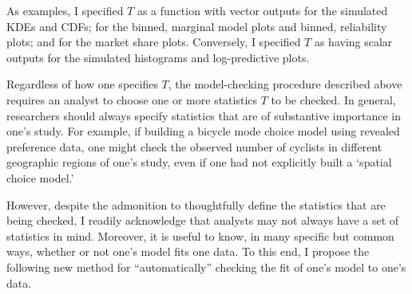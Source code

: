 \documentclass[preprint]{elsarticle}
\begin{document}
As examples, I specified $T$ as a function with vector outputs for the simulated KDEs and CDFs; for the binned, marginal model plots and binned, reliability plots; and for the market share plots. Conversely, I specified $T$ as having scalar outputs for the simulated histograms and log-predictive plots.

Regardless of how one specifies $T$, the model-checking procedure described above requires an analyst to choose one or more statistics $T$ to be checked. In general, researchers should always specify statistics that are of substantive importance in one's study. For example, if building a bicycle mode choice model using revealed preference data, one might check the observed number of cyclists in different geographic regions of one's study, even if one had not explicitly built a `spatial choice model.'

However, despite the admonition to thoughtfully define the statistics that are being checked, I readily acknowledge that analysts may not always have a set of statistics in mind. Moreover, it is useful to know, in many specific but common ways, whether or not one's model fits one data. To this end, I propose the following new method for ``automatically'' checking the fit of one's model to one's data.
\end{document}

